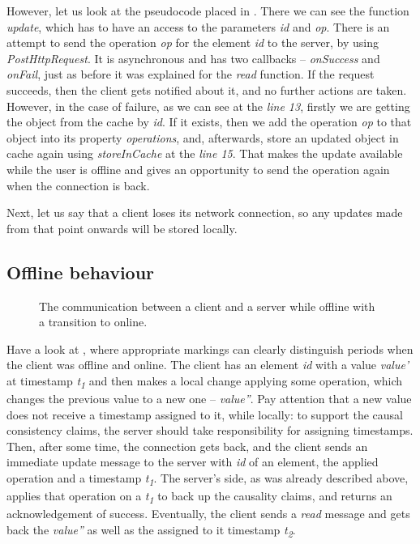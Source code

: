 However, let us look at the pseudocode placed in . There we can see the function \textit{update}, which has to have an access to the parameters \textit{id} and \textit{op}. There is an attempt to send the operation \textit{op} for the element \textit{id} to the server, by using \textit{PostHttpRequest}. It is asynchronous and has two callbacks -- \textit{onSuccess} and \textit{onFail}, just as before it was explained for the \textit{read} function. If the request succeeds, then the client gets notified about it, and no further actions are taken. However, in the case of failure, as we can see at the \textit{line 13}, firstly we are getting the object from the cache by \textit{id}. If it exists, then we add the operation \textit{op} to that object into its property \textit{operations}, and, afterwards, store an updated object in cache again using \textit{storeInCache} at the \textit{line 15}. That makes the update available while the user is offline and gives an opportunity to send the operation again when the connection is back.

Next, let us say that a client loses its network connection, so any updates made from that point onwards will be stored locally.  

\subsection*{Offline behaviour}

\begin{figure}[!htb]
    \begin{center}
    \def\svgwidth{\linewidth}
    
    \caption {The communication between a client and a server while offline with a transition to online.}
    \label{fig:design4}
\end{center}
\end{figure}

Have a look at , where appropriate markings can clearly distinguish periods when the client was offline and online. The client has an element \textit{id} with a value \textit{value'} at timestamp \textit{t\textsubscript{1}} and then makes a local change applying some operation, which changes the previous value to a new one -- \textit{value''}. Pay attention that a new value does not receive a timestamp assigned to it, while locally: to support the causal consistency claims, the server should take responsibility for assigning timestamps. Then, after some time, the connection gets back, and the client sends an immediate update message to the server with \textit{id} of an element, the applied operation and a timestamp \textit{t\textsubscript{1}}. The server's side, as was already described above, applies that operation on a \textit{t\textsubscript{1}} to back up the causality claims, and returns an acknowledgement of success. Eventually, the client sends a \textit{read} message and gets back the \textit{value''} as well as the assigned to it timestamp \textit{t\textsubscript{2}}.

